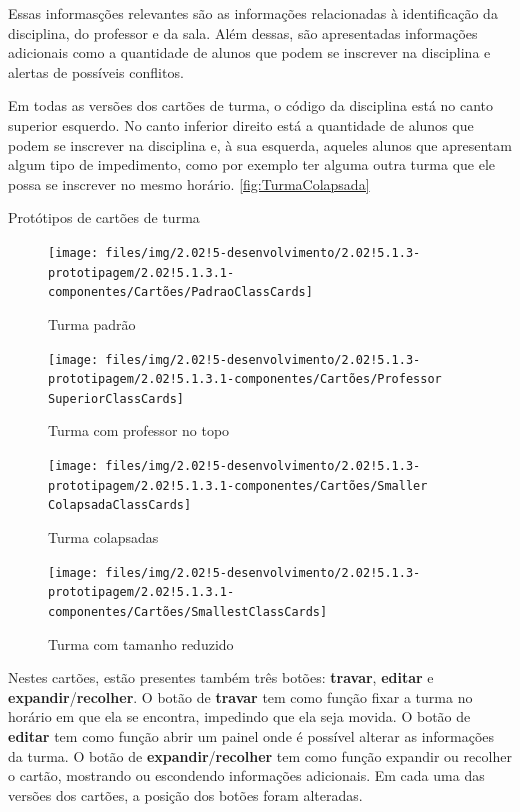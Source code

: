 Essas informasções relevantes são as informações relacionadas à identificação da disciplina, do professor e da sala. Além dessas, são apresentadas informações adicionais como a quantidade de alunos que podem se inscrever na disciplina e alertas de possíveis conflitos.

Em todas as versões dos cartões de turma, o código da disciplina está no canto superior esquerdo. No canto inferior direito está a quantidade de alunos que podem se inscrever na disciplina e, à sua esquerda, aqueles alunos que apresentam algum tipo de impedimento, como por exemplo ter alguma outra turma que ele possa se inscrever no mesmo horário.
\autoref{fig:TurmaColapsada}

\begin{MyCenteredFigure} \caption{Protótipos de cartões de turma} \label{fig:cartão_de_turma}
  \begin{subfigure}[b]{0.45\textwidth} \centering
    \texttt{[image: files/img/2.02!5-desenvolvimento/2.02!5.1.3-prototipagem/2.02!5.1.3.1-componentes/Cartões/PadraoClassCards]}
    \caption{Turma padrão} \label{fig:TurmaPadrão}
  \end{subfigure}
  \hfill
  \begin{subfigure}[b]{0.45\textwidth} \centering
    \texttt{[image: files/img/2.02!5-desenvolvimento/2.02!5.1.3-prototipagem/2.02!5.1.3.1-componentes/Cartões/Professor SuperiorClassCards]}
    \caption{Turma com professor no topo} \label{fig:TurmaTopo}
  \end{subfigure}

  \begin{subfigure}[b]{0.45\textwidth} \centering
    \texttt{[image: files/img/2.02!5-desenvolvimento/2.02!5.1.3-prototipagem/2.02!5.1.3.1-componentes/Cartões/Smaller ColapsadaClassCards]}
    \caption{Turma colapsadas} \label{fig:TurmaColapsada}
  \end{subfigure}
  \hfill
  \begin{subfigure}[b]{0.45\textwidth} \centering
    \texttt{[image: files/img/2.02!5-desenvolvimento/2.02!5.1.3-prototipagem/2.02!5.1.3.1-componentes/Cartões/SmallestClassCards]}
    \caption{Turma com tamanho reduzido} \label{fig:TurmaColapsadaReduzida}
  \end{subfigure}
\end{MyCenteredFigure}

Nestes cartões, estão presentes também três botões: \textbf{travar}, \textbf{editar} e \textbf{expandir}/\textbf{recolher}. O botão de \textbf{travar} tem como função fixar a turma no horário em que ela se encontra, impedindo que ela seja movida. O botão de \textbf{editar} tem como função abrir um painel onde é possível alterar as informações da turma. O botão de \textbf{expandir}/\textbf{recolher} tem como função expandir ou recolher o cartão, mostrando ou escondendo informações adicionais. Em cada uma das versões dos cartões, a posição dos botões foram alteradas.

